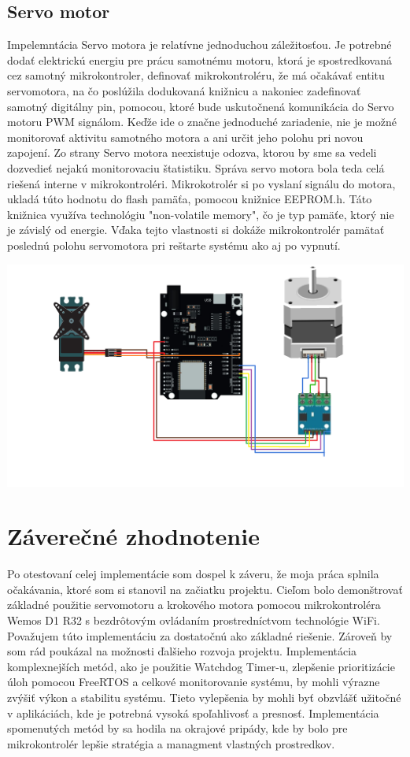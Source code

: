 \documentclass[a4paper, 11pt]{article}
\begin{document}
\subsection{Servo motor}
Impelemntácia Servo motora je relatívne jednoduchou záležitosťou. Je potrebné dodať elektrickú energiu pre prácu samotnému motoru, ktorá je spostredkovaná cez samotný mikrokontroler, definovať mikrokontroléru, že má očakávať entitu servomotora, na čo poslúžila dodukovaná knižnicu a nakoniec zadefinovať samotný digitálny pin, pomocou, ktoré bude uskutočnená komunikácia do Servo motoru PWM signálom. Keďže ide o značne jednoduché zariadenie, nie je možné monitorovať aktivitu samotného motora a ani určit jeho polohu pri novou zapojení. Zo strany Servo motora neexistuje odozva, ktorou by sme sa vedeli dozvedieť nejakú monitorovaciu štatistiku. Správa servo motora bola teda celá riešená interne v mikrokontroléri. Mikrokotrolér si po vyslaní signálu do motora, ukladá túto hodnotu do flash pamäťa, pomocou knižnice EEPROM.h. Táto knižnica využíva technológiu "non-volatile memory", čo je typ pamäťe, ktorý nie je závislý od energie. Vďaka tejto vlastnosti si dokáže mikrokontrolér pamätať poslednú polohu servomotora pri reštarte systému ako aj po vypnutí. 



\includegraphics[width=0.9 \linewidth]{include/462556003_559687976836752_7762418375852550792_n.png}

\clearpage
\section{Záverečné zhodnotenie}
Po otestovaní celej implementácie som dospel k záveru, že moja práca splnila očakávania, ktoré som si stanovil na začiatku projektu. Cieľom bolo demonštrovať základné použitie servomotoru a krokového motora pomocou mikrokontroléra Wemos D1 R32 s bezdrôtovým ovládaním prostredníctvom technológie WiFi. Považujem túto implementáciu za dostatočnú ako základné riešenie. Zároveň by som rád poukázal na možnosti ďalšieho rozvoja projektu. Implementácia komplexnejších metód, ako je použitie Watchdog Timer-u, zlepšenie prioritizácie úloh pomocou FreeRTOS a celkové monitorovanie systému, by mohli výrazne zvýšiť výkon a stabilitu systému. Tieto vylepšenia by mohli byť obzvlášť užitočné v aplikáciách, kde je potrebná vysoká spoľahlivosť a presnosť. Implementácia spomenutých metód by sa hodila na okrajové pripády, kde by bolo pre mikrokontrolér lepšie stratégia a managment vlastných prostredkov. 
\end{document}
